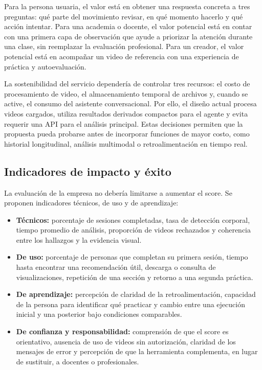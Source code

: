 \documentclass[12pt,a4paper]{article}
\begin{document}
Para la persona usuaria, el valor está en obtener una respuesta concreta a tres preguntas: qué parte del movimiento revisar, en qué momento hacerlo y qué acción intentar. Para una academia o docente, el valor potencial está en contar con una primera capa de observación que ayude a priorizar la atención durante una clase, sin reemplazar la evaluación profesional. Para un creador, el valor potencial está en acompañar un video de referencia con una experiencia de práctica y autoevaluación.

La sostenibilidad del servicio dependería de controlar tres recursos: el costo de procesamiento de video, el almacenamiento temporal de archivos y, cuando se active, el consumo del asistente conversacional. Por ello, el diseño actual procesa videos cargados, utiliza resultados derivados compactos para el agente y evita requerir una API para el análisis principal. Estas decisiones permiten que la propuesta pueda probarse antes de incorporar funciones de mayor costo, como historial longitudinal, análisis multimodal o retroalimentación en tiempo real.

\subsection{Indicadores de impacto y éxito}
La evaluación de la empresa no debería limitarse a aumentar el score. Se proponen indicadores técnicos, de uso y de aprendizaje:

\begin{itemize}
  \item \textbf{Técnicos:} porcentaje de sesiones completadas, tasa de detección corporal, tiempo promedio de análisis, proporción de videos rechazados y coherencia entre los hallazgos y la evidencia visual.
  \item \textbf{De uso:} porcentaje de personas que completan su primera sesión, tiempo hasta encontrar una recomendación útil, descarga o consulta de visualizaciones, repetición de una sección y retorno a una segunda práctica.
  \item \textbf{De aprendizaje:} percepción de claridad de la retroalimentación, capacidad de la persona para identificar qué practicar y cambio entre una ejecución inicial y una posterior bajo condiciones comparables.
  \item \textbf{De confianza y responsabilidad:} comprensión de que el score es orientativo, ausencia de uso de videos sin autorización, claridad de los mensajes de error y percepción de que la herramienta complementa, en lugar de sustituir, a docentes o profesionales.
\end{itemize}
\end{document}
